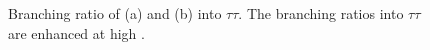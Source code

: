 \begin{figure}[h!]
\begin{center}
\end{center}
\caption[Branching ratio of \PHiggs and \PHiggsps into $\tau\tau$.]{Branching ratio of (a) \PHiggs and (b) \PHiggsps into $\tau\tau$. The branching
ratios into $\tau\tau$ are enhanced at high \tanb.}
\label{fig:mhmodp_br}
\end{figure}


